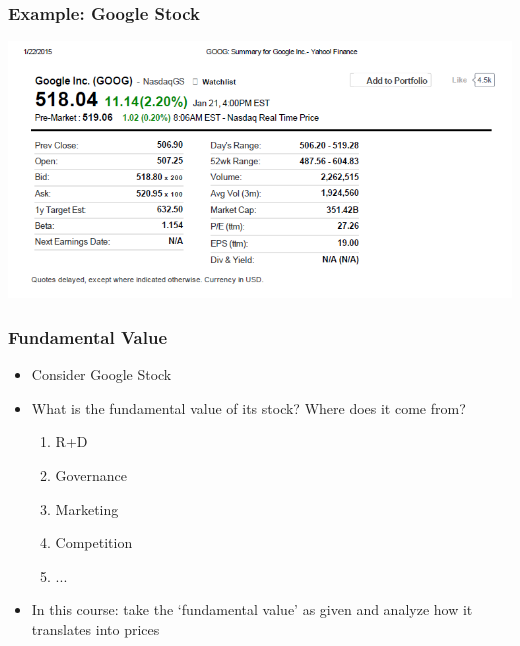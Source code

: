 \documentclass[english,10pt]{beamer}
\theoremstyle{definition}
\begin{document}
\begin{frame}
\frametitle{Example: Google Stock}

\includegraphics[width=1\linewidth]{pics/StockSummary_Google}


\end{frame}


\begin{frame}[label=main4]
\frametitle{Fundamental Value}
\begin{itemize}
\item Consider Google Stock
\item What is the fundamental value of its stock? Where does it come from?
\begin{enumerate}
\item R+D
\item Governance
\item Marketing
\item Competition
\item ...
\end{enumerate}
\item In this course: take the `fundamental value' as given and analyze how it translates into prices

 \hyperlink{quote}{}

\end{itemize}

\end{frame}
\end{document}
